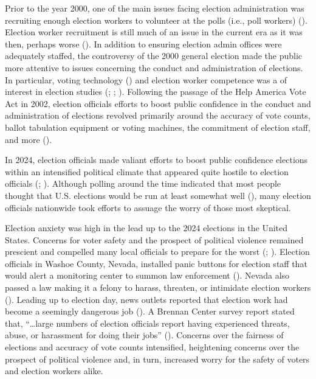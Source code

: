 \documentclass[
  12pt,
  letterpaper,
]{article}
\begin{document}
Prior to the year 2000, one of the main issues facing election
administration was recruiting enough election workers to volunteer at
the polls (i.e., poll workers) (). Election worker recruitment is still much of an issue in the
current era as it was then, perhaps worse
(). In
addition to ensuring election admin offices were adequately staffed, the
controversy of the 2000 general election made the public more attentive
to issues concerning the conduct and administration of elections. In
particular, voting technology () and election worker competence was a of
interest in election studies (; ;
).
Following the passage of the Help America Vote Act in 2002, election
officials efforts to boost public confidence in the conduct and
administration of elections revolved primarily around the accuracy of
vote counts, ballot tabulation equipment or voting machines, the
commitment of election staff, and more
().

In 2024, election officials made valiant efforts to boost public
confidence elections within an intensified political climate that
appeared quite hostile to election officials
(; ). Although
polling around the time indicated that most people thought that U.S.
elections would be run at least somewhat well
(), many election officials
nationwide took efforts to assuage the worry of those most skeptical.

Election anxiety was high in the lead up to the 2024 elections in the
United States. Concerns for voter safety and the prospect of political
violence remained prescient and compelled many local officials to
prepare for the worst (;
). Election officials in
Washoe County, Nevada, installed panic buttons for election staff that
would alert a monitoring center to summon law enforcement
(). Nevada also passed a law
making it a felony to harass, threaten, or intimidate election workers
(). Leading up to election day, news outlets reported that election
work had become a seemingly dangerous job (). A Brennan Center survey report stated that,
``\ldots large numbers of election officials report having experienced
threats, abuse, or harassment for doing their jobs''
(). Concerns over the
fairness of elections and accuracy of vote counts intensified,
heightening concerns over the prospect of political violence and, in
turn, increased worry for the safety of voters and election workers
alike.
\end{document}
